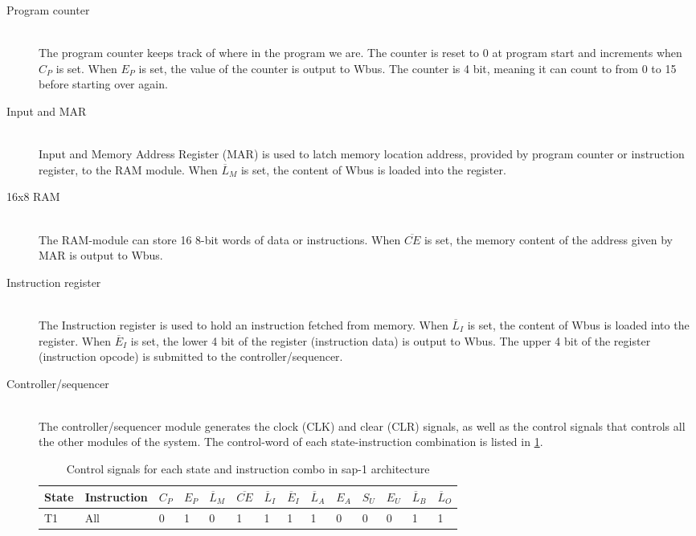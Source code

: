 \begin{description}
    \item[Program counter] \hfill \\
    The program counter keeps track of where in the program we are. The counter is reset to 0 at program start and increments when $C_P$ is set. When $E_P$ is set, the value of the counter is output to Wbus. The counter is 4 bit, meaning it can count to from 0 to 15 before starting over again.
    \item[Input and MAR] \hfill \\
    Input and Memory Address Register (MAR) is used to latch memory location address, provided by program counter or instruction register, to the RAM module. When $\overline{L}_M$ is set, the content of Wbus is loaded into the register.  
    \item[16x8 RAM] \hfill \\
    The RAM-module can store 16 8-bit words of data or instructions. When $\overline{CE}$ is set, the memory content of the address given by MAR is output to Wbus.
    \item[Instruction register] \hfill \\
    The Instruction register is used to hold an instruction fetched from memory. When $\overline{L}_I$ is set, the content of Wbus is loaded into the register. When $\overline{E}_I$ is set, the lower 4 bit of the register (instruction data) is output to Wbus. The upper 4 bit of the register (instruction opcode) is submitted to the controller/sequencer.
    \item[Controller/sequencer] \hfill \\
    The controller/sequencer module generates the clock (CLK) and clear (CLR) signals, as well as the control signals that controls all the other modules of the system. The control-word of each state-instruction combination is listed in \cref{tab:sap1control}.
    \begin{table}[hbpt]
    \centering
    \caption{\label{tab:sap1control}Control signals for each state and instruction combo in \gls{sap-1} architecture}
    \begin{tabular}{p{0.8cm}lp{0.3cm}p{0.3cm}p{0.3cm}p{0.3cm}p{0.3cm}p{0.3cm}p{0.3cm}p{0.3cm}p{0.3cm}p{0.3cm}p{0.3cm}p{0.3cm}}
    \textbf{State} & \textbf{Instruction} & $C_P$ & $E_P$ & $\overline{L}_M$ & $\overline{CE}$ & $\overline{L}_I$ & $\overline{E}_I$ & $\overline{L}_A$ & $E_A$ & $S_U$ & $E_U$ & $\overline{L}_B$ & $\overline{L}_O$\\
    \hline
    T1 &All&	        0&	1&	0&	1&	1&	1&	1&	0&	0&	0&	1&	1\\

\end{tabular}
\end{table}
\end{description}
